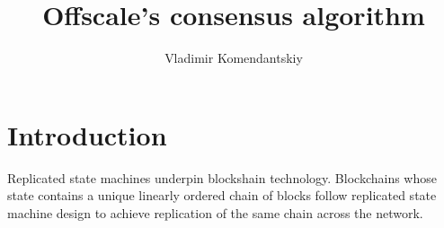 \documentclass[a4paper,11pt]{article}
\title{Offscale's consensus algorithm}
\author{Vladimir Komendantskiy}
\begin{document}
\maketitle



\section{Introduction}

Replicated state machines underpin blockshain technology. Blockchains whose state contains a unique
linearly ordered chain of blocks follow replicated state machine design to achieve replication of the
same chain across the network.
\end{document}
